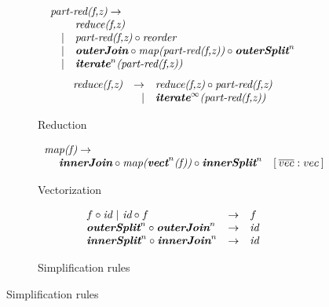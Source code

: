 \begin{figure}[t]
\vspace{-0.5em}
\begin{subfigure}[b]{1\linewidth}
\begin{mdframed}
$$
\begin{array}{lrl}
\multicolumn{3}{l}{\pat{part-red(f,z)} \rightarrow} \\
  & & \pat{reduce(f,z)}\\                                                      
  &| & \pat{part-red(f,z)} \circ \pat{reorder}\\    
  &| & \pat{\textbf{outerJoin}} \circ \pat{map(part-red(f,z))} \circ \pat{\textbf{outerSplit}}^n\\
  &| & \pat{\textbf{iterate}}^{n}\pat{(part-red(f,z))}\\
\end{array}
$$
$$
\begin{array}{lrl}
  \pat{reduce(f,z)} & \rightarrow & \pat{reduce(f,z)} \circ \pat{part-red(f,z)}\\
  & | & \pat{\textbf{iterate}}^{\infty}\pat{(part-red(f,z))}\\

\end{array}
$$
\end{mdframed}
  \caption{Reduction}
  \label{fig:algo:red}
\end{subfigure}

\vspace{-0.5em}
\begin{subfigure}[b]{1\linewidth}
\begin{mdframed}
$$
\begin{array}{lrll}
\multicolumn{2}{l}{\pat{map(f)} \rightarrow} \\
 {\ }   & \pat{\textbf{innerJoin}} \circ \pat{map(\textbf{vect}}^n\pat{(f))} \circ \pat{\textbf{innerSplit}}^n & [\hspace{.2em}\overline{vec}:vec\hspace{.2em}]
\end{array}
$$
\end{mdframed}
  \caption{Vectorization}
   \label{fig:algo:vect}
\end{subfigure}

\vspace{-0.5em}
\begin{subfigure}[b]{1\linewidth}
\begin{mdframed}
$$
\begin{array}{lrl}
f \circ \textit{id}\ |\ \textit{id} \circ f & \rightarrow & f\\
\textit{\textbf{outerSplit}}^n \circ \textit{\textbf{outerJoin}}^n & \rightarrow & \textit{id}\\
\textit{\textbf{innerSplit}}^n \circ \textit{\textbf{innerJoin}}^n & \rightarrow & \textit{id}\\
\end{array}
$$
\end{mdframed}
  \caption{Simplification rules}
   \label{fig:algo:simpl}
\end{subfigure}


\end{figure}
